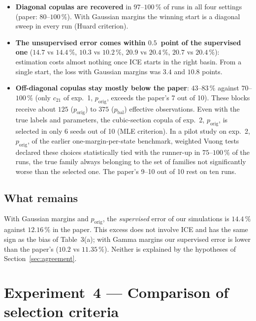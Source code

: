 \documentclass[11pt,a4paper]{article}
\newcommand{\porig}{p_{\text{orig}}}
\newcommand{\pbal}{p_{\text{bal}}}
\begin{document}
\begin{itemize}
  \item \textbf{Diagonal copulas are recovered} in $97$--$100\,\%$ of runs in
        all four settings (paper: $80$--$100\,\%$). With Gaussian margins the
        winning start is a diagonal sweep in every run (Huard criterion).
  \item \textbf{The unsupervised error comes within $0.5$~point of the
        supervised one} ($14.7$ vs $14.4\,\%$, $10.3$ vs $10.2\,\%$, $20.9$ vs
        $20.4\,\%$, $20.7$ vs $20.4\,\%$): estimation costs almost nothing once
        ICE starts in the right basin. From a single start, the loss with
        Gaussian margins was $3.4$ and $10.8$ points.
  \item \textbf{Off-diagonal copulas stay mostly below the paper}:
        $43$--$83\,\%$ against $70$--$100\,\%$ (only $c_{21}$ of exp.~1,
        $\porig$, exceeds the paper's 7 out of 10). These blocks receive about $125$ ($\porig$)
        to $375$ ($\pbal$) effective observations. Even with the true labels
        and parameters, the cubic-section copula of exp.~2, $\porig$, is
        selected in only 6 seeds out of 10 (MLE criterion). In a pilot study
        on exp.~2, $\porig$, of the earlier one-margin-per-state benchmark,
        weighted Vuong tests~\cite{vuong1989} declared these choices
        statistically tied with the runner-up in $75$--$100\,\%$ of the runs,
        the true family always belonging to the set of families not
        significantly worse than the selected one. The paper's
        9--10 out of 10 rest on ten runs.
\end{itemize}

\subsection{What remains}\label{sec:exp3-remaining}

With Gaussian margins and $\porig$, the \emph{supervised} error of our
simulations is $14.4\,\%$ against $12.16\,\%$ in the paper. This excess does
not involve ICE and has the same sign as the bias of Table~3(a); with Gamma
margins our supervised error is lower than the paper's ($10.2$ vs
$11.35\,\%$). Neither is explained by the hypotheses of
Section~\ref{sec:agreement}.

\section{Experiment~4 --- Comparison of selection criteria}\label{sec:exp4}
\end{document}
